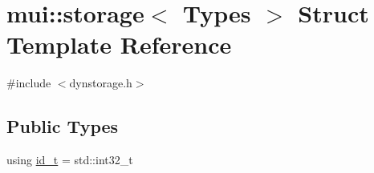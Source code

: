 \hypertarget{structmui_1_1storage}{}\section{mui\+:\+:storage$<$ Types $>$ Struct Template Reference}
\label{structmui_1_1storage}


{\ttfamily \#include $<$dynstorage.\+h$>$}

\subsection*{Public Types}
\begin{DoxyCompactItemize}
\item 
using \hyperlink{structmui_1_1storage_a1e1d8c3e802463d4b0e3804865e365de}{id\+\_\+t} = std\+::int32\+\_\+t
\end{DoxyCompactItemize}
